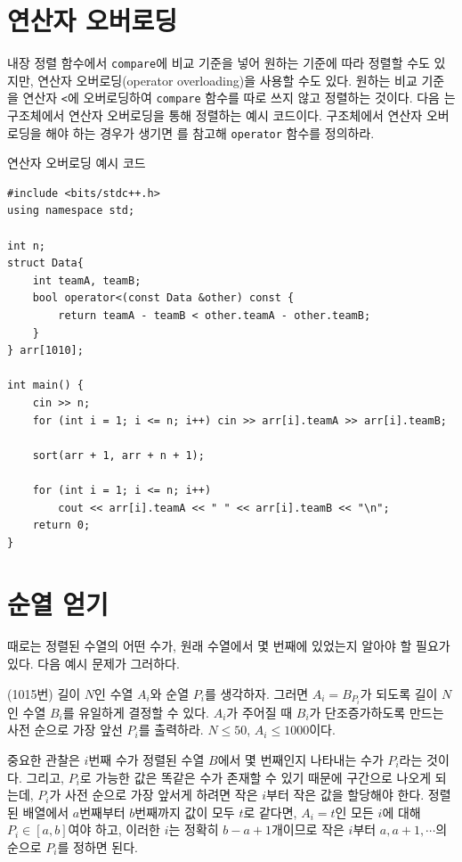 \section{연산자 오버로딩}
내장 정렬 함수에서 \texttt{compare}에 비교 기준을 넣어 원하는 기준에 따라 정렬할 수도 있지만, 연산자 오버로딩(operator overloading)을 사용할 수도 있다. 원하는 비교 기준을 연산자 \texttt{<}에 오버로딩하여 \texttt{compare} 함수를 따로 쓰지 않고 정렬하는 것이다. 다음 는 구조체에서 연산자 오버로딩을 통해 정렬하는 예시 코드이다. 구조체에서 연산자 오버로딩을 해야 하는 경우가 생기면 를 참고해 \texttt{operator} 함수를 정의하라.

\begin{code} \label{code: operator-overloading}
연산자 오버로딩 예시 코드
\begin{lstlisting}
#include <bits/stdc++.h>
using namespace std;

int n;
struct Data{
    int teamA, teamB;
    bool operator<(const Data &other) const {
        return teamA - teamB < other.teamA - other.teamB;
    }
} arr[1010];

int main() {
    cin >> n;
    for (int i = 1; i <= n; i++) cin >> arr[i].teamA >> arr[i].teamB;

    sort(arr + 1, arr + n + 1);

    for (int i = 1; i <= n; i++) 
        cout << arr[i].teamA << " " << arr[i].teamB << "\n";
    return 0;
}
\end{lstlisting}
\end{code}

\section{순열 얻기}
때로는 정렬된 수열의 어떤 수가, 원래 수열에서 몇 번째에 있었는지 알아야 할 필요가 있다. 다음 예시 문제가 그러하다.

\begin{example}
    (1015번) 길이 $N$인 수열 $A_i$와 순열 $P_i$를 생각하자. 그러면 $A_i = B_{P_i}$가 되도록 길이 $N$인 수열 $B_i$를 유일하게 결정할 수 있다. $A_i$가 주어질 때 $B_i$가 단조증가하도록 만드는 사전 순으로 가장 앞선 $P_i$를 출력하라. $N \leq 50$, $A_i \leq 1000$이다.
\end{example}

중요한 관찰은 $i$번째 수가 정렬된 수열 $B$에서 몇 번째인지 나타내는 수가 $P_i$라는 것이다. 그리고, $P_i$로 가능한 값은 똑같은 수가 존재할 수 있기 때문에 구간으로 나오게 되는데, $P_i$가 사전 순으로 가장 앞서게 하려면 작은 $i$부터 작은 값을 할당해야 한다. 정렬된 배열에서 $a$번째부터 $b$번째까지 값이 모두 $t$로 같다면, $A_i = t$인 모든 $i$에 대해 $P_i \in [a, b]$여야 하고, 이러한 $i$는 정확히 $b-a+1$개이므로 작은 $i$부터 $a, a+1, \cdots$의 순으로 $P_i$를 정하면 된다.

